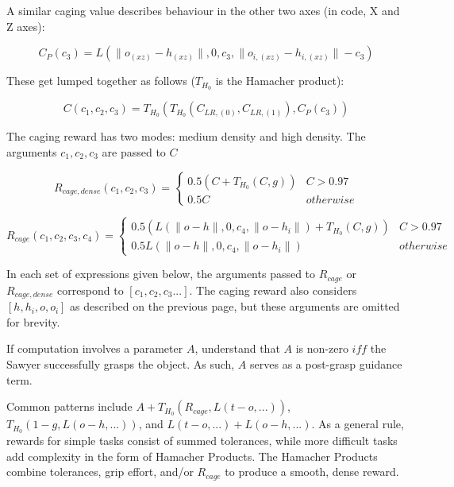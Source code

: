 {A similar caging value describes behaviour in the other two axes (in code, X and Z axes):

\[C_P(c_3) = L\left(
\lVert o_{(xz)} - h_{(xz)} \rVert,
0,
c_3,
\lVert o_{i,(xz)} - h_{i,(xz)} \rVert - c_3
\right)\]

These get lumped together as follows ($T_{H_0}$ is the Hamacher product):

\[C(c_1, c_2, c_3)=T_{H_0}(T_{H_0}(C_{LR,(0)}, C_{LR,(1)}), C_P(c_3))\]


The caging reward has two modes: medium density and high density. The arguments $c_1, c_2, c_3$ are passed to $C$

\[R_{cage,dense}(c_1, c_2, c_3)=\left\{
\begin{array}{ll}
      0.5(C + T_{H_0}(C, g)) & C > 0.97 \\
      0.5C & otherwise
\end{array} \right. \]

\[R_{cage}(c_1, c_2, c_3, c_4)=\left\{
\begin{array}{ll}
      0.5(L(\lVert o - h \rVert, 0, c_4, \lVert o - h_i \rVert) + T_{H_0}(C, g)) & C > 0.97 \\
      0.5L(\lVert o - h \rVert, 0, c_4, \lVert o - h_i \rVert) & otherwise
\end{array} \right. \]

In each set of expressions given below, the arguments passed to $R_{cage}$ or $R_{cage,dense}$ correspond to $[c_1,c_2,c_3...]$. The caging reward also considers $[h,h_i,o,o_i]$ as described on the previous page, but these arguments are omitted for brevity.

If computation involves a parameter $A$, understand that $A$ is non-zero $iff$ the Sawyer successfully grasps the object. As such, $A$ serves as a post-grasp guidance term.

Common patterns include $A+T_{H_0}(R_{cage}, L(t-o,...))$, $T_{H_0}(1-g, L(o-h,...))$, and $L(t-o,...)+L(o-h,...)$. As a general rule, rewards for simple tasks consist of summed tolerances, while more difficult tasks add complexity in the form of Hamacher Products. The Hamacher Products combine tolerances, grip effort, and/or $R_{cage}$ to produce a smooth, dense reward.

\pagebreak


}
